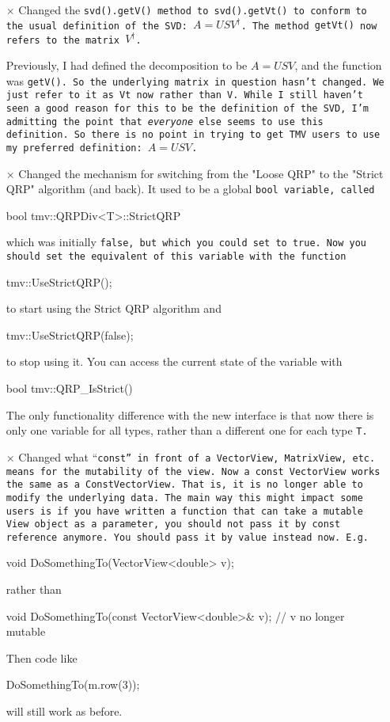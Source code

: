 \begin{itemize}
\item[$\times$]
Changed the \tt{svd().getV()} method to \tt{svd().getVt()} to conform to the
usual definition of the SVD: $A = U S V^\dagger$.  The method \tt{getVt()} now refers to the matrix $V^\dagger$.  

Previously, I had defined the decomposition to be $A = U S V$, and the function was \tt{getV()}.  So the underlying matrix in question hasn't changed.  We just refer to it as \tt{Vt} now rather than
\tt{V}.  While I still haven't seen a good reason for this to be the 
definition of the SVD, I'm admitting the point that {\em everyone} else
seems to use this definition.  So there is no point in trying to get TMV users
to use my preferred definition: $A = U S V$.

\item[$\times$]
Changed the mechanism for switching from the "Loose QRP" to the "Strict QRP"
algorithm (and back).  It used to be a global \tt{bool} variable, called
\begin{tmvcode}
bool tmv::QRPDiv<T>::StrictQRP
\end{tmvcode}
which was initially \tt{false}, but which you could set to \tt{true}.
Now you should set the equivalent of this variable with the function
\begin{tmvcode}
tmv::UseStrictQRP();
\end{tmvcode}
to start using the Strict QRP algorithm and
\begin{tmvcode}
tmv::UseStrictQRP(false);
\end{tmvcode}
to stop using it.  You can access the current state of the variable with
\begin{tmvcode}
bool tmv::QRP_IsStrict()
\end{tmvcode}
The only functionality difference with the new interface is that now there
is only one variable for all types, rather than a different one for each
type \tt{T}.

\item[$\times$]
Changed what ``\tt{const}'' in front of a \tt{VectorView},
\tt{MatrixView}, etc. means for the mutability of the view. 
Now a \tt{const VectorView} works the same as a 
\tt{ConstVectorView}.
That is, it is no longer able to modify the underlying data.
The main way this might impact some users is if you have written a function
that can take a mutable \tt{View} object as a parameter, you should not pass it
by \tt{const} reference anymore.  You should pass it by value instead now.  E.g.
\begin{tmvcode}
void DoSomethingTo(VectorView<double> v);
\end{tmvcode}
rather than
\begin{tmvcode}
void DoSomethingTo(const VectorView<double>& v); // v no longer mutable 
\end{tmvcode}
Then code like 
\begin{tmvcode}
DoSomethingTo(m.row(3));
\end{tmvcode}
will still work as before.


\end{itemize}
